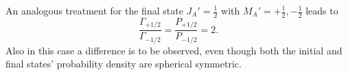 An analogous treatment for the final state
$J_A'=\frac 12$ with $M_A'= +\frac 12, -\frac 12$
leads to
\begin{equation}
  \frac{\Gamma_{+1/2}}{\Gamma_{-1/2}} = \frac{P_{+1/2}}{P_{-1/2}} = 2  .
\end{equation}
Also in this case a difference is to be observed, even though both the initial
and final states' probability density are spherical symmetric.

%
%
%
%
%
%
%
%
